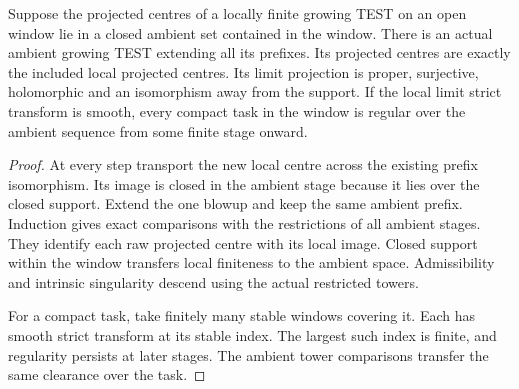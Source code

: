 \begin{theorem}
\label{hir:g8-closed-supported-growing-extension}
\leanok
Suppose the projected centres of a locally finite growing TEST on an
open window lie in a closed ambient set contained in the window.
There is an actual ambient growing TEST extending all its prefixes.
Its projected centres are exactly the included local projected
centres. Its limit projection is proper, surjective, holomorphic
and an isomorphism away from the support. If the local limit strict
transform is smooth, every compact task in the window is regular
over the ambient sequence from some finite stage onward.
\end{theorem}
\begin{proof}
At every step transport the new local centre across the existing
prefix isomorphism. Its image is closed in the ambient stage
because it lies over the closed support. Extend the one blowup
and keep the same ambient prefix. Induction gives exact
comparisons with the restrictions of all ambient stages.
They identify each raw projected centre with its local image.
Closed support within the window transfers local finiteness to
the ambient space. Admissibility and intrinsic singularity
descend using the actual restricted towers.

For a compact task, take finitely many stable windows covering
it. Each has smooth strict transform at its stable index.
The largest such index is finite, and regularity persists at
later stages. The ambient tower comparisons transfer the same
clearance over the task.
\end{proof}

